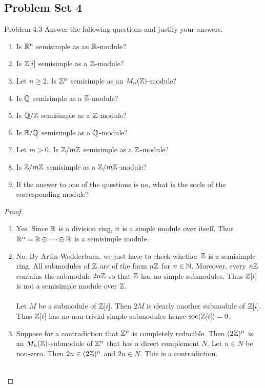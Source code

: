 \documentclass[a4paper]{article}
\begin{document}
\subsection{Problem Set 4}
\begin{ex}{Problem 4.3}{} Answer the following questions and justify your answers. 
\begin{enumerate}
\item Is $\mathbb{R}^n$ semisimple as an $\mathbb{R}$-module?
\item Is $\mathbb{Z}[i]$ semisimple as a $\mathbb{Z}$-module?
\item Let $n\geq 2$. Is $\mathbb{Z}^n$ semisimple as an $M_n(\mathbb{Z})$-module?
\item Is $\mathbb{Q}$ semisimple as a $\mathbb{Z}$-module?
\item Is $\mathbb{Q}/\mathbb{Z}$ semisimple as a $\mathbb{Z}$-module?
\item Is $\mathbb{R}/\mathbb{Q}$ semisimple as a $\mathbb{Q}$-module?
\item Let $m>0$. Is $\mathbb{Z}/m\mathbb{Z}$ semisimple as a $\mathbb{Z}$-module?
\item Is $\mathbb{Z}/m\mathbb{Z}$ semisimple as a $\mathbb{Z}/m\mathbb{Z}$-module?
\item If the answer to one of the questions is no, what is the socle of the corresponding module?
\end{enumerate} \tcbline
\begin{proof}~\\
\begin{enumerate}
\item Yes. Since $\mathbb{R}$ is a division ring, it is a simple module over itself. Thus $\mathbb{R}^n=\mathbb{R}\oplus\cdots\oplus\mathbb{R}$ is a semisimple module. 
\item No. By Artin-Wedderburn, we just have to check whether $\mathbb{Z}$ is a semisimple ring. All submodules of $\mathbb{Z}$ are of the form $n\mathbb{Z}$ for $n\in\mathbb{N}$. Moreover, every $n\mathbb{Z}$ contains the submodule $2n\mathbb{Z}$ so that $\mathbb{Z}$ has no simple submodules. Thus $\mathbb{Z}[i]$ is not a semisimple module over $\mathbb{Z}$. \\~\\

Let $M$ be a submodule of $\mathbb{Z}[i]$. Then $2M$ is clearly another submodule of $\mathbb{Z}[i]$. Thus $\mathbb{Z}[i]$ has no non-trivial simple submodules hence $\text{soc}(\mathbb{Z}[i])=0$. 

\item Suppose for a contradiction that $\mathbb{Z}^n$ is completely reducible. Then $(2\mathbb{Z})^n$ is an $M_n(\mathbb{Z})$-submodule of $\mathbb{Z}^n$ that has a direct complement $N$. Let $n\in N$ be non-zero. Then $2n\in(2\mathbb{Z})^n$ and $2n\in N$. This is a contradiction. \\~\\


\end{enumerate}
\end{proof}
\end{ex}
\end{document}
